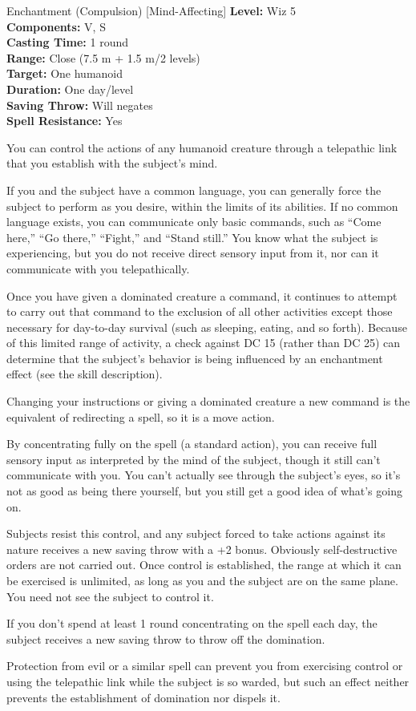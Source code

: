 {Enchantment (Compulsion) [Mind-Affecting]}
{
	\textbf{Level:}
	Wiz 5\\
	\textbf{Components:}
	V, S\\
	\textbf{Casting Time:}
	1 round\\
	\textbf{Range:}
	Close (7.5 m + 1.5 m/2 levels)\\
	\textbf{Target:}
	One humanoid\\
	\textbf{Duration:}
	One day/level\\
	\textbf{Saving Throw:}
	Will negates\\
	\textbf{Spell Resistance:}
	Yes\\
}
{
	You can control the actions of any humanoid creature through a telepathic link that you establish with the subject's mind.

	If you and the subject have a common language, you can generally force the subject to perform as you desire, within the limits of its abilities. If no common language exists, you can communicate only basic commands, such as ``Come here,'' ``Go there,'' ``Fight,'' and ``Stand still.'' You know what the subject is experiencing, but you do not receive direct sensory input from it, nor can it communicate with you telepathically.

	Once you have given a dominated creature a command, it continues to attempt to carry out that command to the exclusion of all other activities except those necessary for day-to-day survival (such as sleeping, eating, and so forth). Because of this limited range of activity, a  check against DC 15 (rather than DC 25) can determine that the subject's behavior is being influenced by an enchantment effect (see the  skill description).

	Changing your instructions or giving a dominated creature a new command is the equivalent of redirecting a spell, so it is a move action.

	By concentrating fully on the spell (a standard action), you can receive full sensory input as interpreted by the mind of the subject, though it still can't communicate with you. You can't actually see through the subject's eyes, so it's not as good as being there yourself, but you still get a good idea of what's going on.

	Subjects resist this control, and any subject forced to take actions against its nature receives a new saving throw with a +2 bonus. Obviously self-destructive orders are not carried out. Once control is established, the range at which it can be exercised is unlimited, as long as you and the subject are on the same plane. You need not see the subject to control it.

	If you don't spend at least 1 round concentrating on the spell each day, the subject receives a new saving throw to throw off the domination.

Protection from evil or a similar spell can prevent you from exercising control or using the telepathic link while the subject is so warded, but such an effect neither prevents the establishment of domination nor dispels it.

}
